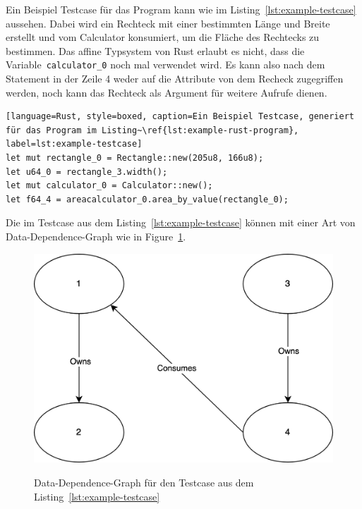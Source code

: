 \documentclass{article}
\begin{document}
Ein Beispiel Testcase für das Program kann wie im Listing~\ref{lst:example-testcase} aussehen. Dabei wird ein Rechteck mit einer bestimmten Länge und Breite erstellt und vom Calculator konsumiert, um die Fläche des Rechtecks zu bestimmen. Das affine Typsystem von Rust erlaubt es nicht, dass die Variable~\lstinline{calculator_0} noch mal verwendet wird. Es kann also nach dem Statement in der Zeile 4 weder auf die Attribute von dem Recheck zugegriffen werden, noch kann das Rechteck als Argument für weitere Aufrufe dienen. 

\begin{lstlisting}[language=Rust, style=boxed, caption=Ein Beispiel Testcase, generiert für das Program im Listing~\ref{lst:example-rust-program}, label=lst:example-testcase]
let mut rectangle_0 = Rectangle::new(205u8, 166u8);
let u64_0 = rectangle_3.width();
let mut calculator_0 = Calculator::new();
let f64_4 = areacalculator_0.area_by_value(rectangle_0);
\end{lstlisting}

Die im Testcase aus dem Listing~\ref{lst:example-testcase} können mit einer Art von Data-Dependence-Graph wie in Figure~\ref{fig:ddg-example}.

\begin{figure}[h]
\caption{Data-Dependence-Graph für den Testcase aus dem Listing~\ref{lst:example-testcase}}
\centering
\includegraphics[width=\textwidth]{DDG}
\label{fig:ddg-example}
\end{figure}
\end{document}
